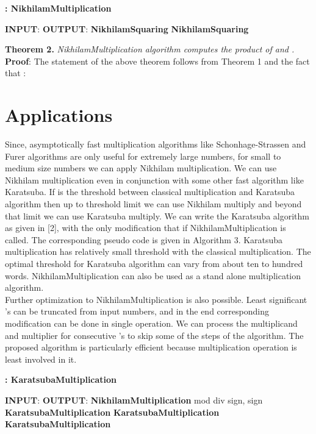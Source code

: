 \documentclass[conference]{IEEEtran}
\begin{document}
\begin{algorithm}
\caption{\bf :  NikhilamMultiplication}
\begin{algorithmic}
\STATE \textbf{INPUT}: 
\STATE \textbf{OUTPUT}: 
\STATE  \textbf{NikhilamSquaring} 
\STATE  \textbf{NikhilamSquaring} 
\RETURN 
\end{algorithmic}
\end{algorithm}

\textbf{Theorem 2.} \textit{NikhilamMultiplication algorithm computes the product of  and .}\\

\textbf{Proof}: The statement of the above theorem follows from Theorem 1 and the fact that :
   \\

\section{Applications}
Since, asymptotically fast multiplication algorithms like Schonhage-Strassen and Furer algorithms are only useful for extremely large numbers, for small to medium size numbers we can apply Nikhilam multiplication. We can use Nikhilam multiplication even in conjunction with some other fast algorithm like Karatsuba. If  is the threshold between classical multiplication and Karatsuba algorithm then up to threshold limit  we can use Nikhilam multiply and beyond that limit we can use Karatsuba multiply. We can write the Karatsuba algorithm as given in [2], with the only modification that if  NikhilamMultiplication is called. The corresponding pseudo code is given in Algorithm 3. Karatsuba multiplication has relatively small threshold with the classical multiplication. The optimal threshold for Karatsuba algorithm can vary from about ten to hundred words. NikhilamMultiplication can also be used as a stand alone multiplication algorithm.\\
\indent Further optimization to NikhilamMultiplication is also possible. Least significant 's can be truncated from input numbers, and in the end corresponding modification can be done in single operation. We can process the multiplicand and multiplier for consecutive 's to skip some of the steps of the algorithm. The proposed algorithm is particularly efficient because multiplication operation is least involved in it.

\begin{algorithm}
\caption{\bf :  KaratsubaMultiplication}
\begin{algorithmic}
\STATE \textbf{INPUT}: 
\STATE \textbf{OUTPUT}: 
\IF {}
\RETURN \textbf{NikhilamMultiplication} 
\ENDIF
\STATE 
\STATE  mod  div  
\STATE  sign,  sign
\STATE  \textbf{KaratsubaMultiplication} 
\STATE  \textbf{KaratsubaMultiplication} 
\STATE  \textbf{KaratsubaMultiplication} 
\RETURN 
\end{algorithmic}
\end{algorithm}
\end{document}
